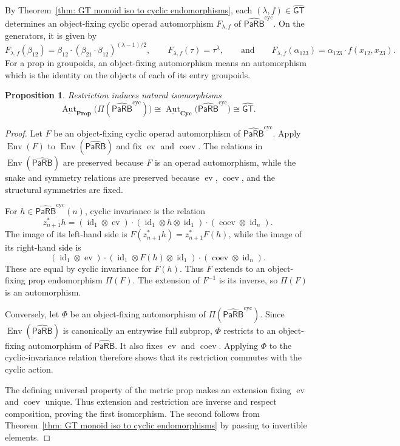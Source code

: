 \documentclass{amsart}
\newcommand{\PaRB}{\mathsf{PaRB}}
\newcommand{\twist}{\tau}
\newcommand{\Cyc}{\mathbf{Cyc}}
\newcommand{\Prop}{\mathbf{Prop}}
\newcommand{\id}{\operatorname{id}}
\newcommand{\Aut}{\operatorname{Aut}}
\newcommand{\ev}{\operatorname{ev}}
\newcommand{\coev}{\operatorname{coev}}
\newcommand{\Env}{\operatorname{Env}}
\newcommand{\GT}{\widehat{\mathsf{GT}}}
\newtheorem{prop}[theorem]{Proposition}%
\theoremstyle{definition}
\numberwithin{equation}{section}
\begin{document}
By Theorem~\ref{thm: GT monoid iso to cyclic endomorphisms}, each
$(\lambda,f)\in\GT$ determines an object-fixing cyclic operad automorphism
$F_{\lambda,f}$ of $\widehat{\PaRB}^{\mathrm{cyc}}$. On the
generators, it is given by
\begin{equation}
\label{eq: GT action generators profinite PaRB}
F_{\lambda,f}(\beta_{12})
=
\beta_{12}\cdot
(\beta_{21}\cdot\beta_{12})^{(\lambda-1)/2},
\qquad
F_{\lambda,f}(\twist)=\twist^\lambda,
\qquad \text{and} \qquad
F_{\lambda,f}(\alpha_{123})
=
\alpha_{123}\cdot f(x_{12},x_{23}).
\end{equation}
For a prop in groupoids, an object-fixing automorphism means an
automorphism which is the identity on the objects of each of its
entry groupoids.

\begin{prop}
\label{prop:GT-metric-prop-profinite}
Restriction induces natural isomorphisms
\[
\underline{\Aut}_{\Prop}\bigl(\Pi(\widehat{\PaRB}^{\mathrm{cyc}})\bigr)
\cong
\underline{\Aut}_{\Cyc}\bigl(\widehat{\PaRB}^{\mathrm{cyc}}\bigr)
\cong
\GT.
\]
\end{prop}

\begin{proof}
Let $F$ be an object-fixing cyclic operad automorphism of
$\widehat{\PaRB}^{\mathrm{cyc}}$. Apply $\Env(F)$ to
$\Env(\widehat{\PaRB})$ and fix $\ev$ and $\coev$. The relations
in $\Env(\widehat{\PaRB})$ are preserved because $F$ is an operad
automorphism, while the snake and symmetry relations are preserved
because $\ev$, $\coev$, and the structural symmetries are fixed.

For $h\in\widehat{\PaRB}^{\mathrm{cyc}}(n)$, cyclic invariance is
the relation
\[
z_{n+1}^*h
=
(\id_1\otimes\ev)
\cdot(\id_1\otimes h\otimes\id_1)
\cdot(\coev\otimes\id_n).
\]
The image of its left-hand side is
$F(z_{n+1}^*h)=z_{n+1}^*F(h)$, while the image of its right-hand
side is
\[
(\id_1\otimes\ev)
\cdot(\id_1\otimes F(h)\otimes\id_1)
\cdot(\coev\otimes\id_n).
\]
These are equal by cyclic invariance for $F(h)$. Thus $F$ extends
to an object-fixing prop endomorphism $\Pi(F)$.
The extension of $F^{-1}$ is its inverse, so $\Pi(F)$ is an
automorphism.

Conversely, let $\Phi$ be an object-fixing automorphism of
$\Pi(\widehat{\PaRB}^{\mathrm{cyc}})$. Since
$\Env(\widehat{\PaRB})$ is canonically an entrywise full
subprop, $\Phi$ restricts to an object-fixing automorphism
of $\widehat{\PaRB}$. It also fixes $\ev$ and $\coev$.
Applying $\Phi$ to the cyclic-invariance relation therefore
shows that its restriction commutes with the cyclic action.

The defining universal property of the metric prop makes
an extension fixing $\ev$ and $\coev$ unique. Thus extension
and restriction are inverse and respect composition, proving
the first isomorphism. The second follows from
Theorem~\ref{thm: GT monoid iso to cyclic endomorphisms}
by passing to invertible elements.
\end{proof}
\end{document}
